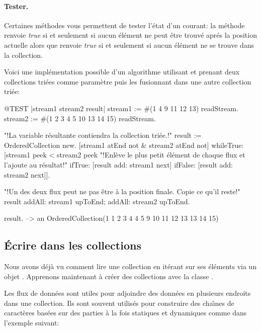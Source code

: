 \documentclass[a4paper,10pt,twoside]{book}
\begin{document}
\paragraph{Tester.} Certaines m\'ethodes vous permettent de tester l'\'etat d'un \stream courant: 
la m\'ethode  renvoie \emph{true} si et seulement si aucun \'el\'ement ne peut \^etre trouv\'e apr\'es la position actuelle alors que  renvoie \emph{true} si et seulement si aucun \'el\'ement ne se trouve dans la collection.

Voici une impl\'ementation possible d'un algorithme utilisant  et prenant deux collections tri\'ees comme param\`etre puis les fusionnant dans une autre collection tri\'ee:

\begin{code}{@TEST |stream1 stream2 result|}
stream1 := #(1 4 9 11 12 13) readStream.
stream2 := #(1 2 3 4 5 10 13 14 15) readStream.

"!La variable r\'esultante contiendra la collection tri\'ee.!"
result := OrderedCollection new.
[stream1 atEnd not & stream2 atEnd not]
  whileTrue: [stream1 peek < stream2 peek
    "!Enl\`eve le plus petit \'el\'ement de chaque flux et l'ajoute au r\'esultat!"
    ifTrue: [result add: stream1 next]
    ifFalse: [result add: stream2 next]].

"!Un des deux flux peut ne pas \^etre \`a la position finale. Copie ce qu'il reste!"
result
  addAll: stream1 upToEnd;
  addAll: stream2 upToEnd.

result. -->   an OrderedCollection(1 1 2 3 4 4 5 9 10 11 12 13 13 14 15)
\end{code}

\subsection{\'Ecrire dans les collections}

Nous avons d\'ej\`a vu comment lire une collection en it\'erant sur ses
\'el\'ements via un objet . Apprenons maintenant \`a cr\'eer
des collections avec la classe .

Les flux de donn\'ees  sont utiles pour adjoindre des donn\'ees en plusieurs endroits dans une collection. Ils sont souvent utilis\'es pour construire des cha\^{\i}nes de caract\`eres bas\'ees sur des parties \`a la fois statiques et dynamiques comme dans l'exemple suivant:
\end{document}
